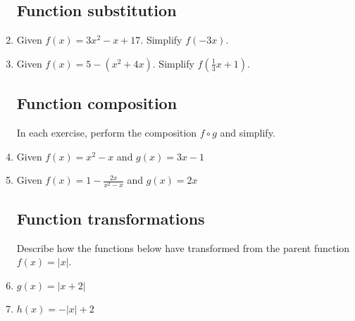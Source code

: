 \documentclass[12pt, twoside]{article}
\begin{document}
\begin{enumerate}
    \subsection*{Function substitution}
    \item Given $f(x)=3x^2-x+17$. Simplify $f(-3x)$.
    \item Given $f(x)=5-(x^2+4x)$. Simplify $f(\frac{1}{3}x+1)$.
    
    \subsection*{Function composition}
    In each exercise, perform the composition $f \circ g$ and simplify.
    \item Given $f(x)=x^2-x$ and $g(x)=3x-1$
    \item Given $\displaystyle f(x)=1-\frac{2x}{x^2-x}$ and $g(x)=2x$
    
     \subsection*{Function transformations}
    Describe how the functions below have transformed from the parent function $f(x)=|x|$.
    \item $g(x)=|x+2|$
    \item $h(x)=-|x|+2$
    
    \newpage
    

\end{enumerate}
\end{document}
